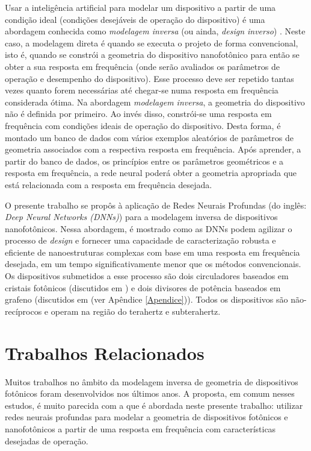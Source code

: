 Usar a inteligência artificial para modelar um dispositivo a partir de uma condição ideal (condições desejáveis de operação do dispositivo) é uma abordagem conhecida como \textit{modelagem inversa} (ou ainda, \textit{design inverso}) \cite{liu2018training,peurifoy2018nanophotonic,Kojima2020sep}. Neste caso, a modelagem direta é quando se executa o projeto de forma convencional, isto é, quando se constrói a geometria do dispositivo nanofotônico para então se obter a sua resposta em frequência (onde serão avaliados os parâmetros de operação e desempenho do dispositivo). Esse processo deve ser repetido tantas vezes quanto forem necessárias até chegar-se numa resposta em frequência considerada ótima. Na abordagem \textit{modelagem inversa}, a geometria do dispositivo não é definida por primeiro. Ao invés disso, constrói-se uma resposta em frequência com condições ideais de operação do dispositivo. Desta forma, é montado um banco de dados com vários exemplos aleatórios de parâmetros de geometria associados com a respectiva resposta em frequência. Após aprender, a partir do banco de dados, os princípios entre os parâmetros geométricos e a resposta em frequência, a rede neural poderá obter a geometria apropriada que está relacionada com a resposta em frequência desejada.

O presente trabalho se propôs à aplicação de Redes Neurais Profundas (do inglês: \textit{Deep Neural Networks (DNNs)}) para a modelagem inversa de dispositivos nanofotônicos. Nessa abordagem, é mostrado como as DNNs podem agilizar o processo de \textit{design} e fornecer uma capacidade de caracterização robusta e eficiente de nanoestruturas complexas com base em uma resposta em frequência desejada, em um tempo significativamente menor que os métodos convencionais. Os dispositivos submetidos a esse processo são dois circuladores baseados em cristais fotônicos (discutidos em \cite{DMITRIEV2021100954}) e dois divisores de potência baseados em grafeno (discutidos em \cite{Dmitriev2021Nonreciprocal} (ver Apêndice \ref{Apendice})). Todos os dispositivos são não-recíprocos e operam na região do terahertz e subterahertz.


\section{Trabalhos Relacionados}      \label{Trabalhos Relacionados}

Muitos trabalhos no âmbito da modelagem inversa de geometria de dispositivos fotônicos foram desenvolvidos nos últimos anos. A proposta, em comum nesses estudos, é muito parecida com a que é abordada neste presente trabalho: utilizar redes neurais profundas para modelar a geometria de dispositivos fotônicos e nanofotônicos a partir de uma resposta em frequência com características desejadas de operação.

